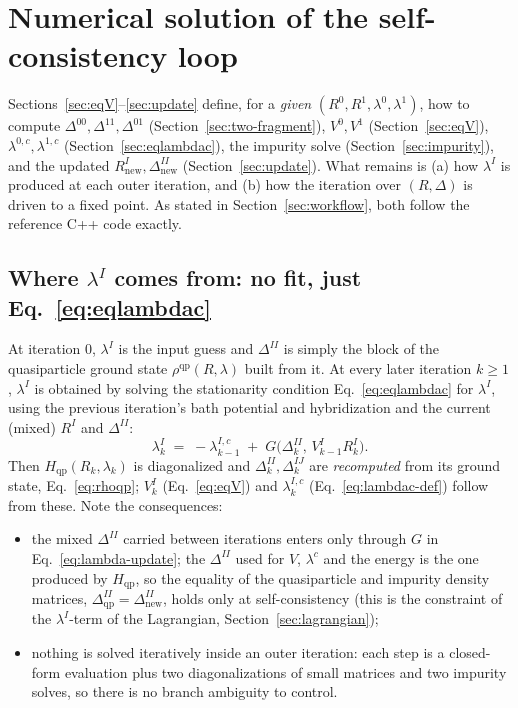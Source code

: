\documentclass[11pt]{article}
\newcommand{\Hqp}{H_{\mathrm{qp}}}
\begin{document}
\section{Numerical solution of the self-consistency loop}
\label{sec:outer-loop}

Sections~\ref{sec:eqV}--\ref{sec:update} define, for a \emph{given}
$(R^0,R^1,\lambda^0,\lambda^1)$, how to compute
$\Delta^{00},\Delta^{11},\Delta^{01}$ (Section~\ref{sec:two-fragment}),
$V^0,V^1$ (Section~\ref{sec:eqV}), $\lambda^{0,c},\lambda^{1,c}$
(Section~\ref{sec:eqlambdac}), the impurity solve
(Section~\ref{sec:impurity}), and the updated
$R^{I}_{\mathrm{new}},\Delta^{II}_{\mathrm{new}}$
(Section~\ref{sec:update}). What remains is (a) how $\lambda^I$ is produced at
each outer iteration, and (b) how the iteration over $(R,\Delta)$ is driven to
a fixed point. As stated in Section~\ref{sec:workflow}, both follow the
reference C++ code exactly.

\subsection{Where $\lambda^I$ comes from: no fit, just Eq.~\eqref{eq:eqlambdac}}
\label{sec:lambdafit}

At iteration $0$, $\lambda^I$ is the input guess and $\Delta^{II}$ is simply
the block of the quasiparticle ground state $\rho^{\mathrm{qp}}(R,\lambda)$
built from it. At every later iteration $k\ge1$, $\lambda^I$ is obtained by
solving the stationarity condition Eq.~\eqref{eq:eqlambdac} for $\lambda^I$,
using the previous iteration's bath potential and hybridization and the
current (mixed) $R^I$ and $\Delta^{II}$:
\begin{equation}
  \lambda^{I}_{k} \;=\; -\lambda^{I,c}_{k-1} \;+\; G\bigl(\Delta^{II}_{k},\,V^{I}_{k-1}R^{I}_{k}\bigr).
  \label{eq:lambda-update}
\end{equation}
Then $\Hqp(R_k,\lambda_k)$ is diagonalized and $\Delta^{II}_k,\Delta^{IJ}_k$ are
\emph{recomputed} from its ground state, Eq.~\eqref{eq:rhoqp}; $V^I_k$
(Eq.~\eqref{eq:eqV}) and $\lambda^{I,c}_k$ (Eq.~\eqref{eq:lambdac-def}) follow
from these. Note the consequences:
\begin{itemize}
  \item the mixed $\Delta^{II}$ carried between iterations enters only through
    $G$ in Eq.~\eqref{eq:lambda-update}; the $\Delta^{II}$ used for $V$,
    $\lambda^c$ and the energy is the one produced by $\Hqp$, so the equality
    of the quasiparticle and impurity density matrices,
    $\Delta^{II}_{\mathrm{qp}}=\Delta^{II}_{\mathrm{new}}$, holds only at
    self-consistency (this is the constraint of the $\lambda^I$-term of the
    Lagrangian, Section~\ref{sec:lagrangian});
  \item nothing is solved iteratively inside an outer iteration: each step is
    a closed-form evaluation plus two diagonalizations of small matrices and
    two impurity solves, so there is no branch ambiguity to control.
\end{itemize}
\end{document}
